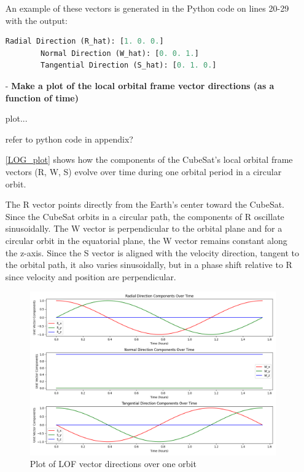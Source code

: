 \begin{itemize}
    An example of these vectors is generated in the Python code on lines 20-29 with the output:
    \begin{lstlisting}[frame=single, language=Python]
        Radial Direction (R_hat): [1. 0. 0.]
        Normal Direction (W_hat): [0. 0. 1.]
        Tangential Direction (S_hat): [0. 1. 0.]
    \end{lstlisting}

    
    
    \item[-] \textbf{Make a plot of the local orbital frame vector directions (as a function of time)}

    plot...

    refer to python code in appendix?

    \autoref{LOG_plot} shows how the components of the CubeSat's local orbital frame vectors (R, W, S) evolve over time during one orbital period in a circular orbit.

    The R vector points directly from the Earth’s center toward the CubeSat.
    Since the CubeSat orbits in a circular path, the components of R oscillate sinusoidally.     
    The W vector is perpendicular to the orbital plane and for a circular orbit in the equatorial plane, the W vector remains constant along the z-axis.    
    Since the S vector is aligned with the velocity direction, tangent to the orbital path, it also varies sinusoidally, but in a phase shift relative to R since velocity and position are perpendicular.

    \begin{figure}[h]
        \centering
        \includegraphics[width=0.75\linewidth]{Doc/Graphics/LOF_vector_directions_plot.png}
        \caption{Plot of LOF vector directions over one orbit}
        \label{fig:LOF_plot}
    \end{figure}
\end{itemize}